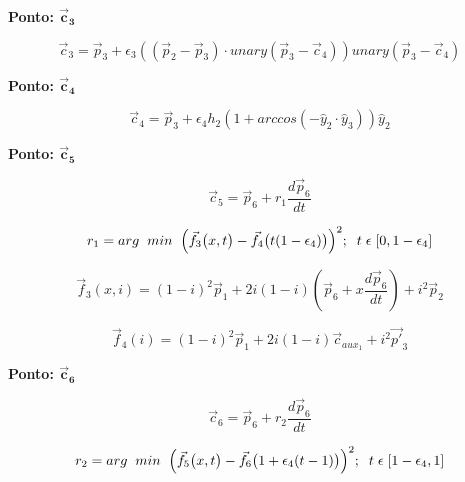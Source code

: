\documentclass[10pt,a4paper]{report}
\begin{document}
\textbf{Ponto: {$\boldsymbol{\vec{c}_{3}}$}}

\begin{equation}
\vec{c}_{3} = \vec{p}_{3} + \epsilon_{3} ((\vec{p}_{2} - \vec{p}_{3}) \cdot unary(\vec{p}_{3} - \vec{c}_{4})) unary(\vec{p}_{3} - \vec{c}_{4})
\label{eq:c3}
\end{equation}

\textbf{Ponto: {$\boldsymbol{\vec{c}_{4}}$}}

\begin{equation}
\vec{c}_{4} = \vec{p}_{3} + \epsilon_{4} h_{2} (1 + arccos(-\hat{y}_{2} \cdot \hat{y}_{3})) \hat{y}_{2}
\label{eq:c4}
\end{equation}

\textbf{Ponto: {$\boldsymbol{\vec{c}_{5}}$}}

\begin{equation}
\vec{c}_{5} = \vec{p}_{6} + r_{1} \frac{d \vec{p}_{6}}{dt}
\label{eq:c5}
\end{equation}

\begin{equation}
r_{1} = arg \hspace{0.2cm} min \hspace{0.2cm} \Big( \vec{f}_{3} \big( x, t \big) - \vec{f}_{4} \big( t (1 - \epsilon_{4}) \big) \Big) ^{2}; \hspace{0.2cm}  t \hspace{0.1cm}  \epsilon \hspace{0.1cm}  [0, 1 - \epsilon_{4}]
\label{eq:r1}
\end{equation}

\begin{equation}
\vec{f}_{3}(x, i) = (1 - i)^{2} \vec{p}_{1} + 2 i (1 - i) (\vec{p}_{6} + x \frac{d \vec{p}_{6}}{dt}) + i^{2} \vec{p}_{2}
\label{eq:f3}
\end{equation}

\begin{equation}
\vec{f}_{4}(i) = (1 - i)^{2} \vec{p}_{1} + 2 i (1 - i) \vec{c}_{aux_{1}} + i^{2} \vec{p'}_{3}
\label{eq:f4}
\end{equation}

\textbf{Ponto: {$\boldsymbol{\vec{c}_{6}}$}}

\begin{equation}
\vec{c}_{6} = \vec{p}_{6} + r_{2} \frac{d \vec{p}_{6}}{dt}
\label{eq:c6}
\end{equation}

\begin{equation}
r_{2} = arg \hspace{0.2cm} min \hspace{0.2cm} \Big( \vec{f}_{5} \big( x, t \big) - \vec{f}_{6} \big( 1 + \epsilon_{4}(t - 1) \big) \Big) ^{2}; \hspace{0.2cm}  t \hspace{0.1cm}  \epsilon \hspace{0.1cm}  [1 - \epsilon_{4}, 1]
\label{eq:r2}
\end{equation}
\end{document}
